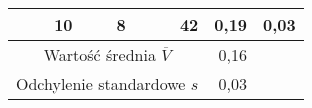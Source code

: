\begin{table}[H]
{\begin{tabular}{|r|r|r|r|r}
10                        & 8                                & 42                       & 0,19                               & \multicolumn{1}{r|}{0,03}                                \\ \hline
\multicolumn{3}{|c|}{Wartość średnia $\overline{V}$}                   & 0,16                               & \multicolumn{1}{l}{}                                     \\ \cline{1-4}
\multicolumn{3}{|c|}{Odchylenie standardowe $s$}                                        & 0,03                               & \multicolumn{1}{l}{}                                     \\ \cline{1-4}
\end{tabular}%
}
\end{table}